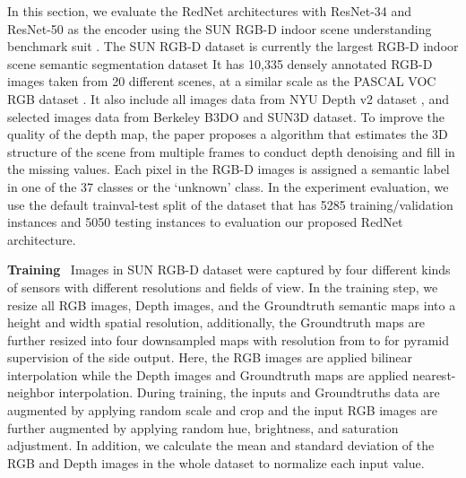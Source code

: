 \documentclass[runningheads]{llncs}
\begin{document}
In this section, we evaluate the RedNet architectures with ResNet-34 and ResNet-50 as the encoder using the SUN RGB-D indoor scene understanding benchmark suit \cite{song2015sun}. The SUN RGB-D dataset is currently the largest RGB-D indoor scene semantic segmentation dataset It has 10,335 densely annotated RGB-D images taken from 20 different scenes, at a similar scale as the PASCAL VOC RGB dataset \cite{everingham2015pascal}. It also include all images data from NYU Depth v2 dataset \cite{silberman2012indoor}, and selected images data from Berkeley B3DO \cite{janoch2011category} and SUN3D \cite{xiao2013sun3d} dataset. To improve the quality of the depth map, the paper proposes a algorithm that estimates the 3D structure of the scene from multiple frames to conduct depth denoising and fill in the missing values. Each pixel in the RGB-D images is assigned a semantic label in one of the 37 classes or the `unknown' class. In the experiment evaluation, we use the default trainval-test split of the dataset that has 5285 training/validation instances and 5050 testing instances to evaluation our proposed RedNet architecture.

\textbf{Training}~ Images in SUN RGB-D dataset were captured by four different kinds of sensors with different resolutions and fields of view. In the training step, we resize all RGB images, Depth images, and the Groundtruth semantic maps into a  height and width spatial resolution, additionally, the Groundtruth maps are further resized into four downsampled maps with resolution from  to  for pyramid supervision of the side output. Here, the RGB images are applied bilinear interpolation while the Depth images and Groundtruth maps are applied nearest-neighbor interpolation. During training, the inputs and Groundtruths data are augmented by applying random scale and crop and the input RGB images are further augmented by applying random hue, brightness, and saturation adjustment. In addition, we calculate the mean and standard deviation of the RGB and Depth images in the whole dataset to normalize each input value.
\end{document}
